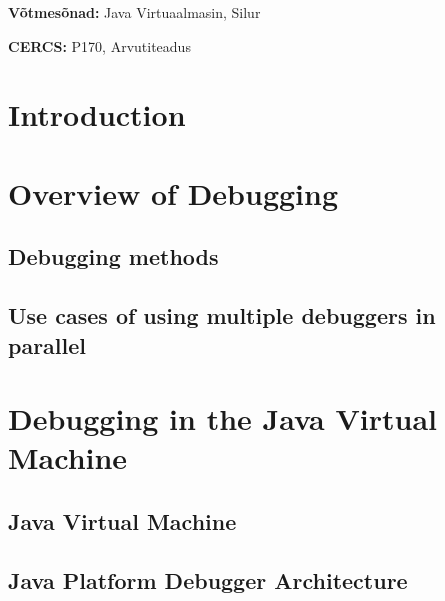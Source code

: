 \documentclass{style/bachelor-thesis}
\begin{document}
\begin{flushleft}
  \textbf{Võtmesõnad:} Java Virtuaalmasin, Silur 
\end{flushleft}
\vspace*{3ex}

\noindent\textbf{CERCS:} P170, Arvutiteadus

\newpage




\tableofcontents

\pagebreak


\section{Introduction}


\pagebreak

\section{Overview of Debugging}
\label{sec:debugging}


\subsection{Debugging methods}
\label{sec:debugging_methods}


\subsection{Use cases of using multiple debuggers in parallel}
\label{sec:debugging_usecases}


\pagebreak

\section{Debugging in the Java Virtual Machine}
\label{sec:jvm_debugging}
 

\subsection{Java Virtual Machine}
\label{sec:jvm}


\subsection{Java Platform Debugger Architecture}
\label{sec:jpda}

\end{document}
